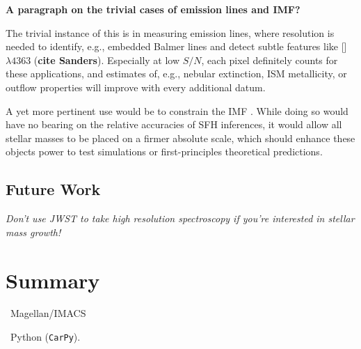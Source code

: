 \documentclass[a4paper,fleqn,usenatbib]{mnras}
\newcommand{\bfr}{\bf\color{red}}
\newcommand{\facilities}{{\it Facilities:}}
\newcommand{\software}{{\it Software:}}
\begin{document}
{\bfr A paragraph on the trivial cases of emission lines and IMF?}

The trivial instance of this is in measuring emission lines, where resolution is needed to 
identify, e.g., embedded Balmer lines and detect subtle features like [] 
$\lambda4363$ ({\bfr cite Sanders}). Especially at low $S/N$, each pixel definitely counts
for these applications, and estimates of, e.g., nebular extinction, ISM metallicity, or outflow
properties will improve with every additional datum.

A yet more pertinent use would be to constrain the IMF \citep{Conroy12}. While doing so 
would have no bearing on the relative accuracies of SFH inferences, it would allow all stellar 
masses to be placed on a firmer absolute scale, which should enhance these objects power to test 
simulations or first-principles theoretical predictions. %
\fi

\subsection{Future Work}
\label{sec:future}

{\it Don't use JWST to take high resolution spectroscopy if you're interested in stellar mass growth!}


\section{Summary}
\label{sec:summary}



\noindent\facilities\ Magellan/IMACS

\noindent\software\ Python (\texttt{CarPy}).%

\end{document}
